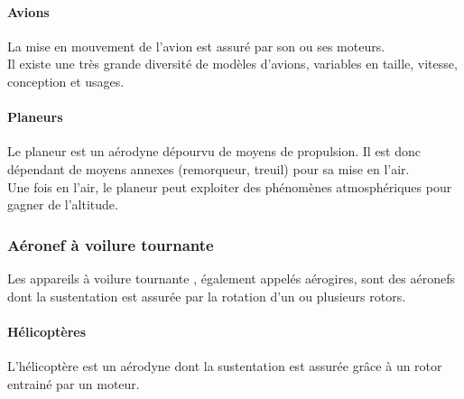 		\paragraph{Avions}
		La mise en mouvement de l'avion  est assuré par son ou ses moteurs. \\
		
		Il existe une très grande diversité de modèles d'avions, variables en taille, vitesse, conception et usages. \\
		
	
		\paragraph{Planeurs}
		Le planeur  est un aérodyne dépourvu de moyens de propulsion. Il est donc dépendant de moyens annexes (remorqueur, treuil) pour sa mise en l'air. \\
		
		Une fois en l'air, le planeur peut exploiter des phénomènes atmosphériques pour gagner de l'altitude. \\
		
		
		
	\subsubsection{Aéronef à voilure tournante}
	Les appareils à voilure tournante , également appelés aérogires, sont des aéronefs dont la sustentation est assurée par la rotation d'un ou plusieurs rotors.
	
		\paragraph{Hélicoptères}
		L'hélicoptère  est un aérodyne dont la sustentation est assurée grâce à un rotor entrainé par un moteur.
		
